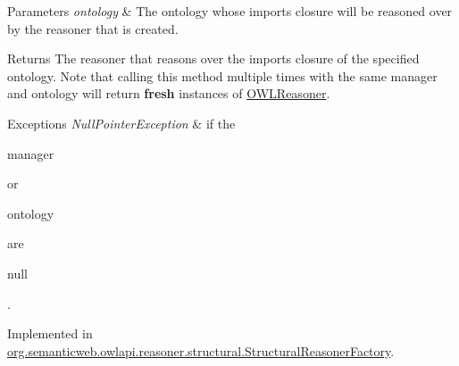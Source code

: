 \begin{DoxyParams}{Parameters}
{\em ontology} & The ontology whose imports closure will be reasoned over by the reasoner that is created. \\
\hline
\end{DoxyParams}
\begin{DoxyReturn}{Returns}
The reasoner that reasons over the imports closure of the specified ontology. Note that calling this method multiple times with the same manager and ontology will return {\bfseries fresh} instances of \hyperlink{interfaceorg_1_1semanticweb_1_1owlapi_1_1reasoner_1_1_o_w_l_reasoner}{O\-W\-L\-Reasoner}. 
\end{DoxyReturn}

\begin{DoxyExceptions}{Exceptions}
{\em Null\-Pointer\-Exception} & if the
\begin{DoxyCode}
manager 
\end{DoxyCode}
 or
\begin{DoxyCode}
ontology 
\end{DoxyCode}
 are
\begin{DoxyCode}
null 
\end{DoxyCode}
 . \\
\hline
\end{DoxyExceptions}


Implemented in \hyperlink{classorg_1_1semanticweb_1_1owlapi_1_1reasoner_1_1structural_1_1_structural_reasoner_factory_a88c377aabdd13914fd8d6c341aa6f513}{org.\-semanticweb.\-owlapi.\-reasoner.\-structural.\-Structural\-Reasoner\-Factory}.

